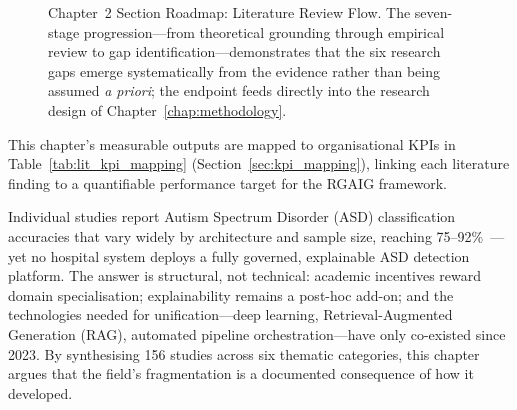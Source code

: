 \begin{figure}[!htbp]
{%
}
\caption[Chapter~2 Section Roadmap: Literature Review Flow]{Chapter~2 Section Roadmap: Literature Review Flow. The seven-stage progression---from theoretical grounding through empirical review to gap identification---demonstrates that the six research gaps emerge systematically from the evidence rather than being assumed \textit{a priori}; the endpoint feeds directly into the research design of Chapter~\ref{chap:methodology}.}
\end{figure}

\noindent This chapter's measurable outputs are mapped to organisational KPIs in Table~\ref{tab:lit_kpi_mapping} (Section~\ref{sec:kpi_mapping}), linking each literature finding to a quantifiable performance target for the RGAIG framework.
\vspace{0.5em}

Individual studies report Autism Spectrum Disorder (ASD) classification accuracies that vary widely by architecture and sample size, reaching 75--92\%~\cite{heinsfeld2018identification}---yet no hospital system deploys a fully governed, explainable ASD detection platform. The answer is structural, not technical: academic incentives reward domain specialisation; explainability remains a post-hoc add-on; and the technologies needed for unification---deep learning, Retrieval-Augmented Generation (RAG), automated pipeline orchestration---have only co-existed since 2023. By synthesising 156 studies across six thematic categories, this chapter argues that the field's fragmentation is a documented consequence of how it developed.


